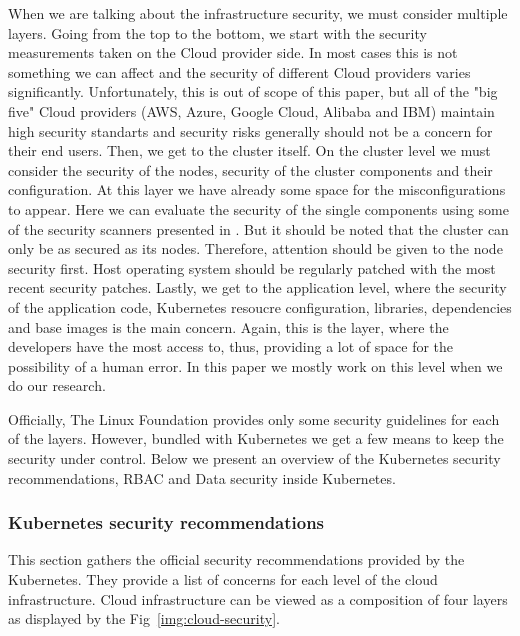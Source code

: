 When we are talking about the infrastructure security, we must consider multiple layers. Going from the top to the bottom, we start with the security measurements taken on the Cloud provider side. In most cases this is not something we can affect and the security of different Cloud providers varies significantly. Unfortunately, this is out of scope of this paper, but all of the "big five" Cloud providers (AWS, Azure, Google Cloud, Alibaba and IBM) maintain high security standarts and security risks generally should not be a concern for their end users. Then, we get to the cluster itself. On the cluster level we must consider the security of the nodes, security of the cluster components and their configuration. At this layer we have already some space for the misconfigurations to appear. Here we can evaluate the security of the single components using some of the security scanners presented in . But it should be noted that the cluster can only be as secured as its nodes. Therefore, attention should be given to the node security first. Host operating system should be regularly patched with the most recent security patches. Lastly, we get to the application level, where the security of the application code, Kubernetes resoucre configuration, libraries, dependencies and base images is the main concern. Again, this is the layer, where the developers have the most access to, thus, providing a lot of space for the possibility of a human error. In this paper we mostly work on this level when we do our research.

Officially, The Linux Foundation provides only some security guidelines for each of the layers. However, bundled with Kubernetes we get a few means to keep the security under control. Below we present an overview of the Kubernetes security recommendations, RBAC and Data security inside Kubernetes.

\subsubsection*{Kubernetes security recommendations}

This section gathers the official security recommendations provided by the Kubernetes. They provide a list of concerns for each level of the cloud infrastructure. Cloud infrastructure can be viewed as a composition of four layers as displayed by the Fig~\ref{img:cloud-security}.

